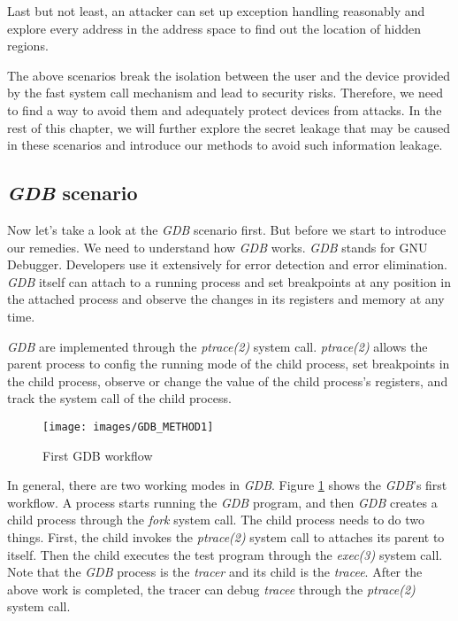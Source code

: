 Last but not least, an attacker can set up exception handling reasonably and 
explore every address in the address space to find out the location of hidden 
regions. 

The above scenarios break the isolation between the user and the device 
provided by the fast system call mechanism and lead to security risks. 
Therefore, we need to find a way to avoid them and adequately protect 
devices from attacks. In the rest of this chapter, we will further 
explore the secret leakage that may be caused in these scenarios and 
introduce our methods to avoid such information leakage.

\subsection{\emph{GDB} scenario}
Now let's take a look at the \emph{GDB} scenario first. 
But before we start to introduce our remedies. We need to understand 
how \emph{GDB} works. \emph{GDB} stands for GNU Debugger. Developers use it extensively for error 
detection and error elimination. \emph{GDB} itself can attach to a running 
process and set breakpoints at any position in the attached process 
and observe the changes in its registers and memory at any time. 


\emph{GDB}\cite{16} are implemented through the \emph{ptrace(2)} system call. 
\emph{ptrace(2)}\cite{17} allows the parent process to config the running mode of 
the child process, set breakpoints in the child process, observe or 
change the value of the child process's registers, and track the system 
call of the child process.

\begin{figure}[tbp]
  \centering
  \texttt{[image: images/GDB\_METHOD1]}
  \caption[Short description]{First GDB workflow}
  \label{fig:GDB_METHOD1}
\end{figure}

In general, there are two working modes in \emph{GDB}. Figure \ref{fig:GDB_METHOD1} shows 
the \emph{GDB}'s first workflow. A process starts running the \emph{GDB} program, 
and then \emph{GDB} creates a child process through the \emph{fork} system call. 
The child process needs to do two things. First, the child 
invokes the \emph{ptrace(2)} system call to attaches its parent to itself. 
Then the child executes the test program through the \emph{exec(3)} 
system call. Note that the \emph{GDB} process is the \emph{tracer} and its child 
is the \emph{tracee}. After the above work is completed, the tracer can debug \emph{tracee} 
through the \emph{ptrace(2)} system call.



